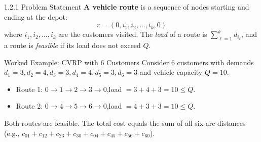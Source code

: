 \documentclass[aspectratio=169,10pt]{beamer}
\begin{document}
\begin{frame}[allowframebreaks]{1.2.1 Problem Statement}
\medskip
\textbf{A vehicle route} is a sequence of nodes starting and ending at the depot:
\[
  r = (0, i_1, i_2, \ldots, i_k, 0)
\]
where $i_1, i_2, \ldots, i_k$ are the customers visited.
The \emph{load} of a route is $\sum_{\ell=1}^{k} d_{i_\ell}$,
and a route is \emph{feasible} if its load does not exceed $Q$.

\begin{exampleblock}{Worked Example: CVRP with 6 Customers}
Consider 6 customers with demands $d_1=3, d_2=4, d_3=3, d_4=4, d_5=3, d_6=3$
and vehicle capacity $Q=10$.
\begin{itemize}
  \item Route 1: $0 \to 1 \to 2 \to 3 \to 0$,\quad load $= 3+4+3 = 10 \leq Q$.
  \item Route 2: $0 \to 4 \to 5 \to 6 \to 0$,\quad load $= 4+3+3 = 10 \leq Q$.
\end{itemize}
Both routes are feasible.  The total cost equals the sum of all six arc distances
(e.g., $c_{01} + c_{12} + c_{23} + c_{30} + c_{04} + c_{45} + c_{56} + c_{60}$).
\end{exampleblock}

\end{frame}
\end{document}
